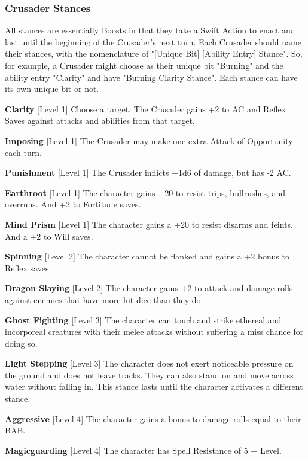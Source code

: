 \subsubsection{Crusader Stances}

All stances are essentially Boosts in that they take a Swift Action to enact and last until the beginning of the Crusader's next turn. Each Crusader should name their stances, with the nomenclature of "[Unique Bit] [Ability Entry] Stance". So, for example, a Crusader might choose as their unique bit "Burning" and the ability entry "Clarity" and have "Burning Clarity Stance". Each stance can have its own unique bit or not.

\newcommand{\crusaderstance}[3]{\textbf{#1} [Level #2] #3\medskip{}}

\crusaderstance{Clarity}{1}{Choose a target. The Crusader gains +2 to AC and Reflex Saves against attacks and abilities from that target.}

\crusaderstance{Imposing}{1}{The Crusader may make one extra Attack of Opportunity each turn.}

\crusaderstance{Punishment}{1}{The Crusader inflicts +1d6 of damage, but has -2 AC.}

\crusaderstance{Earthroot}{1}{The character gains +20 to resist trips, bullrushes, and overruns. And +2 to Fortitude saves.}

\crusaderstance{Mind Prism}{1}{The character gains a +20 to resist disarms and feints. And a +2 to Will saves.}

\crusaderstance{Spinning}{2}{The character cannot be flanked and gains a +2 bonus to Reflex saves.}

\crusaderstance{Dragon Slaying}{2}{The character gains +2 to attack and damage rolls against enemies that have more hit dice than they do.}

\crusaderstance{Ghost Fighting}{3}{The character can touch and strike ethereal and incorporeal creatures with their melee attacks without suffering a miss chance for doing so.}

\crusaderstance{Light Stepping}{3}{The character does not exert noticeable pressure on the ground and does not leave tracks. They can also stand on and move across water without falling in. This stance lasts until the character activates a different stance.}

\crusaderstance{Aggressive}{4}{The character gains a bonus to damage rolls equal to their BAB.}

\crusaderstance{Magicguarding}{4}{The character has Spell Resistance of 5 + Level.}

